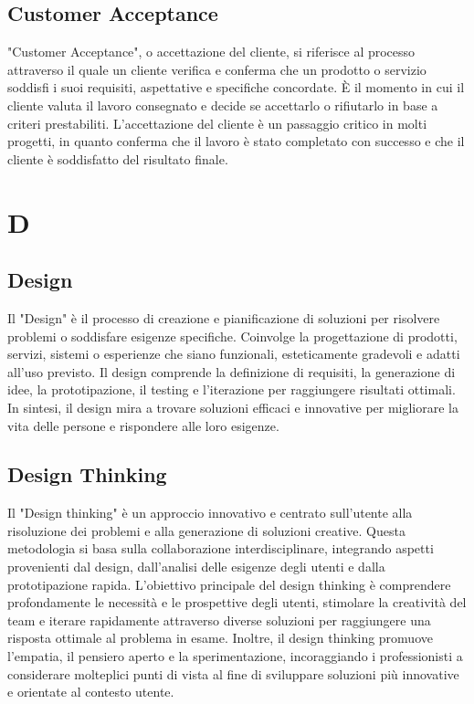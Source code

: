 \documentclass{article}
\begin{document}
\subsection{Customer Acceptance}
"Customer Acceptance", o accettazione del cliente, si riferisce al processo attraverso il quale un cliente verifica e conferma che un prodotto o servizio soddisfi i suoi requisiti, aspettative e specifiche concordate. È il momento in cui il cliente valuta il lavoro consegnato e decide se accettarlo o rifiutarlo in base a criteri prestabiliti. L'accettazione del cliente è un passaggio critico in molti progetti, in quanto conferma che il lavoro è stato completato con successo e che il cliente è soddisfatto del risultato finale.

\section{D}
\subsection{Design}
Il "Design" è il processo di creazione e pianificazione di soluzioni per risolvere problemi o soddisfare esigenze specifiche. Coinvolge la progettazione di prodotti, servizi, sistemi o esperienze che siano funzionali, esteticamente gradevoli e adatti all'uso previsto. Il design comprende la definizione di requisiti, la generazione di idee, la prototipazione, il testing e l'iterazione per raggiungere risultati ottimali. In sintesi, il design mira a trovare soluzioni efficaci e innovative per migliorare la vita delle persone e rispondere alle loro esigenze.

\subsection{Design Thinking}
Il "Design thinking" è un approccio innovativo e centrato sull'utente alla risoluzione dei problemi e alla generazione di soluzioni creative. Questa metodologia si basa sulla collaborazione interdisciplinare, integrando aspetti provenienti dal design, dall'analisi delle esigenze degli utenti e dalla prototipazione rapida. L'obiettivo principale del design thinking è comprendere profondamente le necessità e le prospettive degli utenti, stimolare la creatività del team e iterare rapidamente attraverso diverse soluzioni per raggiungere una risposta ottimale al problema in esame. Inoltre, il design thinking promuove l'empatia, il pensiero aperto e la sperimentazione, incoraggiando i professionisti a considerare molteplici punti di vista al fine di sviluppare soluzioni più innovative e orientate al contesto utente.
\end{document}
